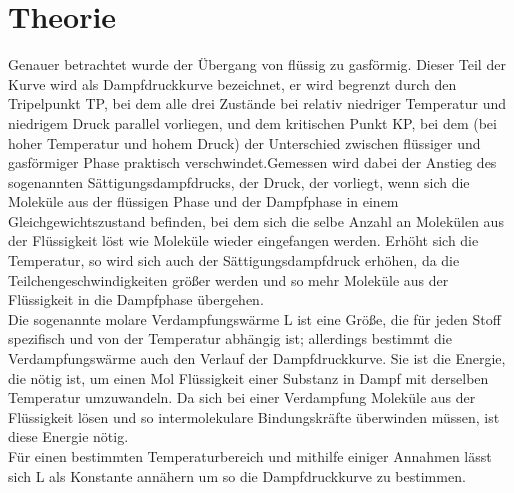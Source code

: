 \section{Theorie}
\label{sec:Theorie}
Genauer betrachtet wurde der Übergang von flüssig zu gasförmig. Dieser Teil der Kurve wird als
Dampfdruckkurve bezeichnet, er wird begrenzt durch den Tripelpunkt TP, bei dem alle drei Zustände
bei relativ niedriger Temperatur und niedrigem Druck parallel vorliegen, und dem kritischen
Punkt KP, bei dem (bei hoher Temperatur und hohem Druck) der Unterschied zwischen flüssiger und
gasförmiger Phase praktisch verschwindet.Gemessen wird dabei der Anstieg des sogenannten Sättigungsdampfdrucks,
der Druck, der vorliegt, wenn sich die Moleküle aus der flüssigen Phase und der Dampfphase in einem 
Gleichgewichtszustand befinden, bei dem sich die selbe Anzahl an Molekülen aus der Flüssigkeit löst wie 
Moleküle wieder eingefangen werden. Erhöht sich die Temperatur, so wird sich auch der Sättigungsdampfdruck 
erhöhen, da die Teilchengeschwindigkeiten größer werden und so mehr Moleküle aus der Flüssigkeit in die 
Dampfphase übergehen. \\
Die sogenannte molare Verdampfungswärme L ist eine Größe, die für jeden Stoff spezifisch und von der 
Temperatur abhängig ist; allerdings bestimmt die Verdampfungswärme auch den Verlauf der 
Dampfdruckkurve. Sie ist die Energie, die nötig ist, um einen Mol Flüssigkeit einer Substanz 
in Dampf mit derselben Temperatur umzuwandeln. Da sich bei einer Verdampfung Moleküle aus der Flüssigkeit
lösen und so intermolekulare Bindungskräfte überwinden müssen, ist diese Energie nötig. \\
Für einen bestimmten Temperaturbereich und mithilfe einiger Annahmen lässt sich
L als Konstante annähern um so die Dampfdruckkurve zu bestimmen. \\

